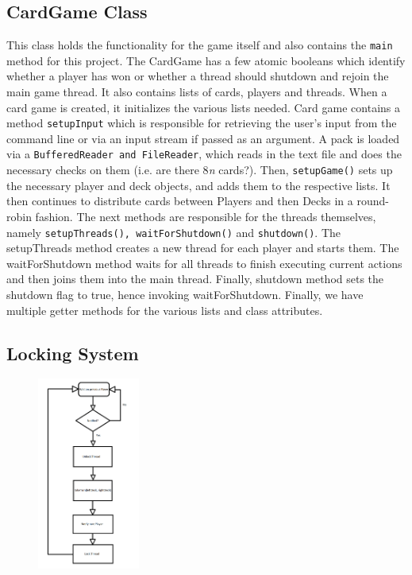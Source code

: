 \documentclass[a4paper, 11pt] {article}
\begin{document}
\subsection*{CardGame Class}
This class holds the functionality for the game itself and also contains the \texttt{main} method for this project. The CardGame has a few atomic booleans which identify whether a player has won or whether a thread should shutdown and rejoin the main game thread. It also contains lists of cards, players and threads. When a card game is created, it initializes the various lists needed. Card game contains a method \texttt{setupInput} which is responsible for retrieving the user's input from the command line or via an input stream if passed as an argument. 
A pack is loaded via a \texttt{BufferedReader and FileReader}, which reads in the text file and does the necessary checks on them (i.e. are there 8\textit{n} cards?). Then, \texttt{setupGame()} sets up the necessary player and deck objects, and adds them to the respective lists. It then continues to distribute cards between Players and then Decks in a round-robin fashion. 
The next methods are responsible for the threads themselves, namely \texttt{setupThreads(), waitForShutdown()} and \texttt{shutdown()}. The setupThreads method creates a new thread for each player and starts them. The waitForShutdown method waits for all threads to finish executing current actions and then joins them into the main thread. Finally, shutdown method sets the shutdown flag to true, hence invoking waitForShutdown.
Finally, we have multiple getter methods for the various lists and class attributes.

\subsection*{Locking System}
\begin{figure}
\centering
\includegraphics[width=0.3\textwidth]{thread_locking.png}
\end{figure}
\end{document}
